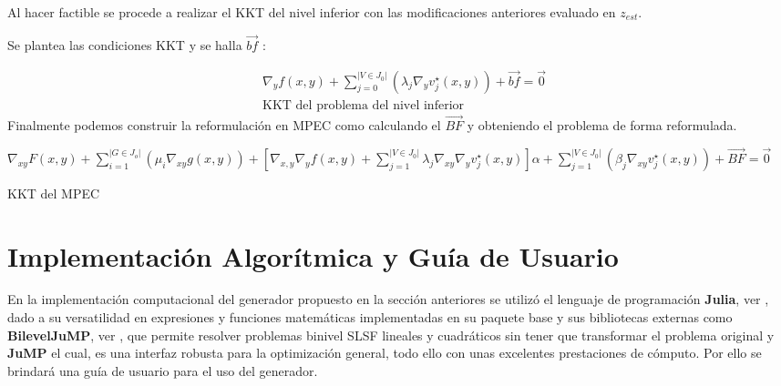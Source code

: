 Al hacer factible se procede a realizar el KKT del nivel inferior con las modificaciones anteriores evaluado en $z_{est}$.

Se plantea las condiciones KKT y se halla $\vec{bf}$ :

\begin{equation}
    \begin{aligned}
        &\nabla_{y}f(x,y)+\sum_{j=0}^{|V \in J_0|}(\lambda_j\nabla_{y}v_{j}^{\star}(x,y))+\vec{bf}=\vec{0}\\
        &\text{KKT del problema del nivel inferior}
    \end{aligned}
    \label{KKT_nivel_inferior}
\end{equation}
\linebreak
Finalmente podemos construir la reformulación en MPEC como  calculando el $\vec{BF}$ y 
obteniendo el problema de forma reformulada.
\begin{table}[H]
    \begin{equation}
        \label{KKT_del_MPEC}
    \end{equation}
	$\nabla_{xy}F(x,y)+\sum_{i=1}^{|G \in J_o|}(\mu_i\nabla_{xy}g(x,y))+[\nabla_{x,y}\nabla_{y}f(x,y)+\sum_{j=1}^{|V \in J_0|}\lambda_j\nabla_{xy}\nabla_{y}v_{j}^{\star}(x,y)]\alpha+\sum_{j=1}^{|V \in J_0|}(\beta_j\nabla_{xy}v_{j}^{\star}(x,y))+\vec{BF}=\vec{0}$  \label{KKT_del_MPEC}
\caption*{KKT del MPEC}
\end{table}


\section{Implementación Algorítmica y Guía de Usuario}
En la implementación computacional del generador propuesto en la sección anteriores
se utilizó el lenguaje de programación \textbf{Julia}, ver \cite{Juliadocs}, dado a su versatilidad
en expresiones y funciones matemáticas implementadas en su paquete base y sus bibliotecas externas como 
\textbf{BilevelJuMP}, ver \cite{BilevelJump}, que permite resolver problemas binivel SLSF lineales y cuadráticos
sin tener que transformar el problema original y \textbf{JuMP} \cite{JuMPPaper} el cual, es una interfaz robusta para la optimización general,
todo ello con unas excelentes prestaciones de cómputo. Por ello se brindará una guía de usuario para el uso del generador.

